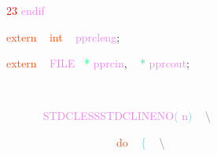 \documentclass[8, usernames, dvipsnames]{beamer}
\begin{document}
\begin{frame}
 \textcolor{Red}{23}
\textcolor{Violet}{endif}
 
 \textcolor{OrangeRed}{extern}
\textcolor{White}{\ }
\textcolor{OrangeRed}{int}
\textcolor{White}{\ }
\textcolor{Violet}{pprcleng}\textcolor{Sepia}{;}

 
 \textcolor{OrangeRed}{extern}
\textcolor{White}{\ }
\textcolor{Violet}{FILE}\textcolor{White}{\ }
\textcolor{SpringGreen}{*}
\textcolor{Violet}{pprcin}\textcolor{Sepia}{,}
\textcolor{White}{\ }
\textcolor{SpringGreen}{*}
\textcolor{Violet}{pprcout}\textcolor{Sepia}{;}

 
 
 \textcolor{White}{\ }
\textcolor{White}{\ }
\textcolor{White}{\ }
\textcolor{White}{\ }

 \textcolor{White}{\ }
\textcolor{White}{\ }
\textcolor{White}{\ }
\textcolor{White}{\ }
\textcolor{Violet}{STDCLESSSTDCLINENO}\textcolor{SkyBlue}{(}
\textcolor{Violet}{n}\textcolor{SkyBlue}{)}
\textcolor{White}{\ }
\textcolor{Gray}{\textbackslash }

 \textcolor{White}{\ }
\textcolor{White}{\ }
\textcolor{White}{\ }
\textcolor{White}{\ }
\textcolor{White}{\ }
\textcolor{White}{\ }
\textcolor{White}{\ }
\textcolor{White}{\ }
\textcolor{White}{\ }
\textcolor{White}{\ }
\textcolor{White}{\ }
\textcolor{White}{\ }
\textcolor{OrangeRed}{do}
\textcolor{White}{\ }
\textcolor{SkyBlue}{\{ }
\textcolor{White}{\ }
\textcolor{Gray}{\textbackslash }

 \end{frame}
\end{document}
